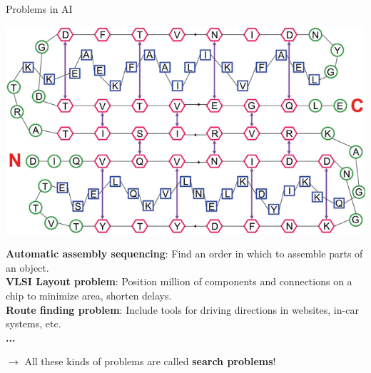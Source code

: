 \documentclass[9pt]{beamer}
\begin{document}
\begin{frame}{Problems in AI}
\begin{small}
\begin{center}
    \includegraphics[keepaspectratio, height=0.15\textheight]{images/protein_design.png}
\end{center}

\textcolor{CS-2}{\textbullet} \textbf{Automatic assembly sequencing}: Find an order in which to assemble parts of an object.\\
\textcolor{CS-2}{\textbullet} \textbf{VLSI Layout problem}: Position million of components and connections on a chip to minimize area, shorten delays.\\
\textcolor{CS-2}{\textbullet} \textbf{Route finding problem}: Include tools for driving directions in websites, in-car systems, etc.\\
\textcolor{CS-2}{\textbullet} \textbf{...}
    

$\rightarrow$ All these kinds of problems are called \textbf{search problems}!
\end{small}
\end{frame}
\end{document}
